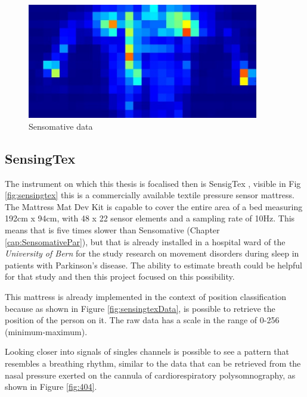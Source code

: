 \begin{figure}[H]
    \centering
    \includegraphics[width=0.9\textwidth]{img/sensomative_2.jpg}
    \caption{Sensomative data}
    \label{fig:sensomativeData}
\end{figure}
\vspace*{0.5cm}

\subsection{SensingTex} \label{cap:SensigTexPar}
The instrument on which this thesis is focalised then is SensigTex \cite{SensingConnectivity}, visible in Fig \ref{fig:sensingtex} this is a commercially available textile pressure sensor mattress. 
The Mattress Mat Dev Kit is capable to cover the entire area of a bed measuring 192cm x 94cm, with 48 x 22 sensor elements and a sampling rate of 10Hz. This means that is five times slower than Sensomative (Chapter \ref{cap:SensomativePar}), but that is already installed in a hospital ward of the \textit{University of Bern} for the study research on movement disorders during sleep in patients with Parkinson's disease. The ability to estimate breath could be helpful for that study and then this project focused on this possibility.

This mattress is already implemented in the context of position classification because as shown in Figure \ref{fig:sensingtexData}, is possible to retrieve the position of the person on it. The raw data has a scale in the range of 0-256 (minimum-maximum). 

Looking closer into signals of singles channels is possible to see a pattern that resembles a breathing rhythm,  similar to the data that can
 be retrieved from the nasal pressure exerted on the cannula of cardiorespiratory polysomnography, as shown in Figure \ref{fig:404}.



